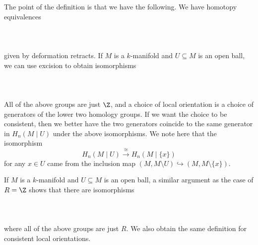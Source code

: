 \documentclass[a4paper]{article}
\begin{document}
The point of the definition is that we have the following. We have homotopy equivalences \\~\\
\\~\\
given by deformation retracts. If $M$ is a $k$-manifold and $U\subseteq M$ is an open ball, we can use excision to obtain isomorphisms \\~\\
\\~\\
All of the above groups are just $\Z$, and a choice of local orientation is a choice of generators of the lower two homology groups. If we want the choice to be consistent, then we better have the two generators coincide to the same generator in $H_n(M\;|\;U)$ under the above isomorphisms. We note here that the isomorphism $$H_n(M\;|\;U)\overset{\cong}{\longrightarrow}H_n(M\;|\;\{x\})$$ for any $x\in U$ came from the inclusion map $(M,M\setminus U)\hookrightarrow(M,M\setminus\{x\})$. 

If $M$ is a $k$-manifold and $U\subseteq M$ is an open ball, a similar argument as the case of $R=\Z$ shows that there are isomorphisms \\~\\
\\~\\
where all of the above groups are just $R$. We also obtain the same definition for consistent local orientations. 
\end{document}
